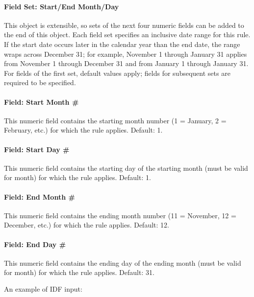 \paragraph{Field Set: Start/End Month/Day}

This object is extensible, so sets of the next four numeric fields can be added to the end of this object.
Each field set specifies an inclusive date range for this rule.
If the start date occurs later in the calendar year than the end date, the range wraps across December 31; for example, November 1 through January 31 applies from November 1 through December 31 and from January 1 through January 31.
For fields of the first set, default values apply; fields for subsequent sets are required to be specified.

\paragraph{Field: Start Month \#}\label{field-start-month-scheduleweekrule}

This numeric field contains the starting month number (1 = January, 2 = February, etc.) for which the rule applies.
Default: 1.

\paragraph{Field: Start Day \#}\label{field-date-start-day-scheduleweekrule}

This numeric field contains the starting day of the starting month (must be valid for month) for which the rule applies.
Default: 1.

\paragraph{Field: End Month \#}\label{field-end-month-scheduleweekrule}

This numeric field contains the ending month number (11 = November, 12 = December, etc.) for which the rule applies.
Default: 12.

\paragraph{Field: End Day \#}\label{field-end-day-scheduleweekrule}

This numeric field contains the ending day of the ending month (must be valid for month) for which the rule applies.
Default: 31.

An example of IDF input:

